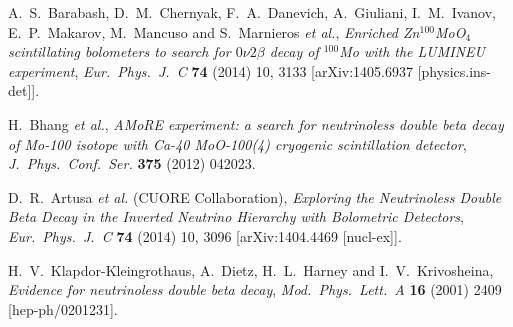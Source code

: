 \documentclass{PoS}
\begin{document}
\begin{thebibliography}{99}
   A.~S.~Barabash, D.~M.~Chernyak, F.~A.~Danevich, A.~Giuliani, I.~M.~Ivanov, E.~P.~Makarov, M.~Mancuso and S.~Marnieros {\it et al.},
   \emph{Enriched Zn$^{100}$MoO$_4$ scintillating bolometers to search for $0 \nu 2\beta$ decay of $^{100}$Mo with the LUMINEU experiment},
   \emph{Eur.\ Phys.\ J.\ C} {\bf 74} (2014) 10,  3133
   [arXiv:1405.6937 [physics.ins-det]].

   H.~Bhang {\it et al.},
   \emph{AMoRE experiment: a search for neutrinoless double beta decay of Mo-100 isotope with Ca-40 MoO-100(4) cryogenic scintillation detector},
   \emph{J.\ Phys.\ Conf.\ Ser.} {\bf 375} (2012) 042023.

   D.~R.~Artusa {\it et al.} (CUORE Collaboration),
   \emph{Exploring the Neutrinoless Double Beta Decay in the Inverted Neutrino Hierarchy with Bolometric Detectors},
   \emph{Eur.\ Phys.\ J.\ C} {\bf 74} (2014) 10,  3096
   [arXiv:1404.4469 [nucl-ex]].

   H.~V.~Klapdor-Kleingrothaus, A.~Dietz, H.~L.~Harney and I.~V.~Krivosheina,
   \emph{Evidence for neutrinoless double beta decay},
   \emph{Mod.\ Phys.\ Lett.\ A} {\bf 16} (2001) 2409
   [hep-ph/0201231].

\end{thebibliography}
\end{document}
